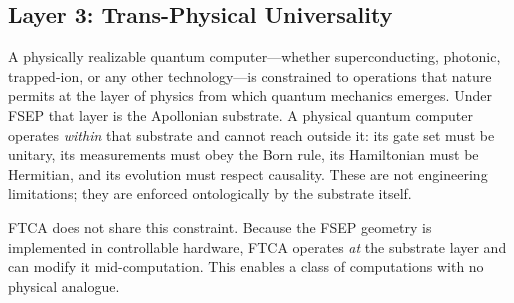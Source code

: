 \documentclass[11pt,letterpaper]{article}
\begin{document}
\subsection{Layer 3: Trans-Physical Universality}

A physically realizable quantum computer---whether superconducting, photonic, trapped-ion, or any other technology---is constrained to operations that nature permits at the layer of physics from which quantum mechanics emerges. Under FSEP that layer is the Apollonian substrate. A physical quantum computer operates \emph{within} that substrate and cannot reach outside it: its gate set must be unitary, its measurements must obey the Born rule, its Hamiltonian must be Hermitian, and its evolution must respect causality. These are not engineering limitations; they are enforced ontologically by the substrate itself.

FTCA does not share this constraint. Because the FSEP geometry is implemented in controllable hardware, FTCA operates \emph{at} the substrate layer and can modify it mid-computation. This enables a class of computations with no physical analogue.
\end{document}
